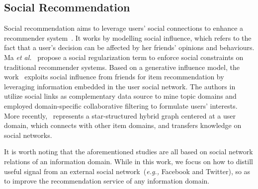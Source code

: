 \documentclass[sigconf]{acmart}
\newcommand{\eg}{\emph{e.g., }}
\newcommand{\etal}{\emph{et al.}}
\begin{document}
\subsection{Social Recommendation}
Social recommendation aims to leverage users' social connections to enhance a recommender system~\cite{DBLP:conf/wsdm/RenLLWR17,DBLP:conf/kdd/ZhangZYZHH16}.
It works by modelling social influence, which refers to the fact that a user's decision can be affected by her friends' opinions and behaviours.
Ma \etal~\cite{DBLP:conf/wsdm/MaZLLK11} propose a social regularization term to enforce social constraints on traditional recommender systems. Based on a generative influence model, the work~\cite{DBLP:conf/sigir/YeLL12} exploits social influence from friends for item recommendation by leveraging information embedded in the user social network. The authors in~\cite{DBLP:conf/www/ZhangCYNL13} utilize social links as complementary data source to mine topic domains and employed domain-specific collaborative filtering to formulate users' interests. More recently,~\cite{DBLP:journals/tkde/JiangCCW0Y15} represents a star-structured hybrid graph centered at a user domain, which connects with other item domains, and transfers knowledge on social networks.

It is worth noting that the aforementioned studies are all based on social network relations of an information domain. While in this work, we focus on how to distill useful signal from an external social network~(\eg Facebook and Twitter), so as to improve the recommendation service of any information domain.
\end{document}
